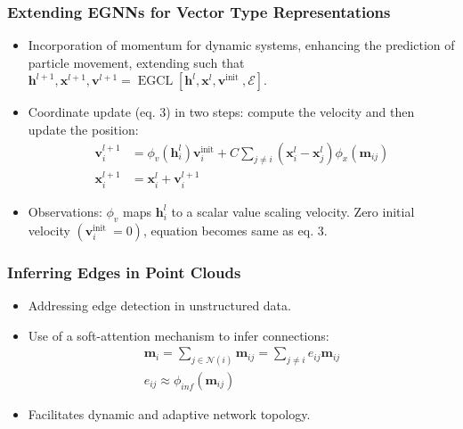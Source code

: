 \documentclass[11pt,xcolor={dvipsnames},hyperref={pdftex,pdfpagemode=UseNone,hidelinks,pdfdisplaydoctitle=true},usepdftitle=false]{beamer}
\newcommand{\rmm}{\mathbf{m}}
\newcommand{\rmh}{\mathbf{h}}
\newcommand{\rmx}{\mathbf{x}}
\newcommand{\rmv}{\mathbf{v}}
\begin{document}
\begin{frame}
\frametitle{Extending EGNNs for Vector Type Representations}
\begin{itemize}
      \item Incorporation of momentum for dynamic systems, enhancing the prediction of particle movement, extending such that $\mathbf{h}^{l+1}, \mathbf{x}^{l+1}, \mathbf{v}^{l+1}=\operatorname{EGCL}\left[\mathbf{h}^l, \mathbf{x}^l, \mathbf{v}^{\text {init }}, \mathcal{E}\right]$. 
      \item Coordinate update (eq. 3) in two steps: compute the velocity and then update the position:
      \begin{equation}
        \begin{aligned}
    \mathbf{v}_{i}^{l+1}&= \phi_{v}\left(\rmh_{i}^l\right)\rmv_{i}^\text{init} + C\sum_{j \neq i}\left(\mathbf{x}_{i}^{l}-\mathbf{x}_{j}^{l}\right) \phi_{x}\left(\mathbf{m}_{ij}\right) \\
    \rmx_{i}^{l+1} &=\mathbf{x}_{i}^{l}+ \mathbf{v}_i^{l+1}
        \end{aligned}
    \end{equation}
        
    \item Observations: $\phi_v$ maps $\mathbf{h}_i^l$ to a scalar value scaling velocity. Zero initial velocity $\left(\mathbf{v}_i^{\text {init }}=0\right)$, equation becomes same as eq. 3.
\end{itemize}
\end{frame}

\begin{frame}
\frametitle{Inferring Edges in Point Clouds}
\begin{itemize}
      \item Addressing edge detection in unstructured data.
      \item Use of a soft-attention mechanism to infer connections:
    \begin{equation}
        \begin{aligned}
    \mathbf{m}_i=\sum_{j \in \mathcal{N}(i)} \mathbf{m}_{i j}=\sum_{j \neq i} e_{i j} \mathbf{m}_{i j} \\
    e_{ij} \approx \phi_{inf}(\rmm_{ij})
        \end{aligned}
    \end{equation}
      \item Facilitates dynamic and adaptive network topology.
\end{itemize}
\end{frame}
\end{document}
